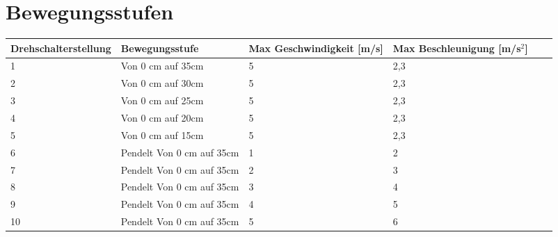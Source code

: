 %
%

\chapter{Bewegungsstufen} \label{bew}


\fontsize{8}{10}\selectfont
\begin{tabularx}{\textwidth}{|p{3cm}|X|X|X|p{1cm}|X|}
	\hline 
	\textbf{Drehschalterstellung}  & \textbf{Bewegungsstufe} & \textbf{Max Geschwindigkeit [m/s]} &  \textbf{Max Beschleunigung [m/s$^{2}$]} \\ \hline
	1 & Von 0 cm auf 35cm & 5 & 2,3   \\
	\hline
	2 & Von 0 cm auf 30cm & 5 & 2,3 \\
	\hline
	3 & Von 0 cm auf 25cm & 5 & 2,3 \\
	\hline
	4 & Von 0 cm auf 20cm & 5 & 2,3 \\
	\hline
	5 & Von 0 cm auf 15cm & 5 & 2,3 \\
	\hline
	6 & Pendelt Von 0 cm auf 35cm & 1 & 2 \\
	\hline
	7 &Pendelt Von 0 cm auf 35cm & 2 & 3 \\
	\hline
	8 & Pendelt Von 0 cm auf 35cm & 3 & 4 \\
	\hline
	9 & Pendelt Von 0 cm auf 35cm & 4 & 5 \\
	\hline
	10 & Pendelt Von 0 cm auf 35cm & 5 & 6 \\
	\hline
	
	
\end{tabularx}

